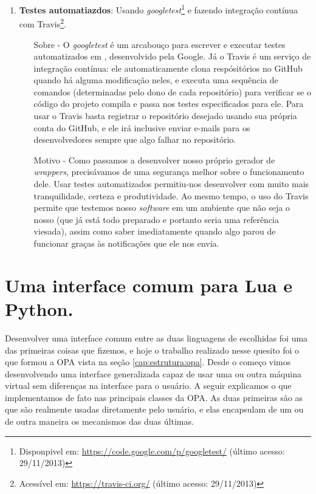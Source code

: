 \begin{enumerate}
    \item \textbf{Testes automatiazdos}: Usando \textit{googletest}\footnote{Disponpivel
      em: \url{https://code.google.com/p/googletest/} (último acesso: 29/11/2013)} e
      fazendo integração contínua com Travis\footnote{Acessível em:
      \url{https://travis-ci.org/} (último acesso: 29/11/2013)}.
      \begin{itemize}
        \item[Sobre -] O \textit{googletest} é um arcabouço para escrever e
          executar testes automatizados em \CXX{}, desenvolvido pela Google.
          Já o Travis é um serviço de integração contínua: ele
          automaticamente clona respósitórios no GitHub quando há alguma
          modificação neles, e executa uma sequência de comandos (determinadas
          pelo dono de cada repositório) para verificar se o código do projeto
          compila e passa nos testes especificados para ele. Para usar o
          Travis basta registrar o repositório desejado usando sua própria conta
          do GitHub, e ele irá inclusive enviar e-mails para os desenvolvedores
          sempre que algo falhar no repositório.
        \item[Motivo -] Como passamos a desenvolver nosso próprio gerador de
          \textit{wrappers}, precisávamos de uma segurança melhor sobre o
          funcionamento dele. Usar testes automatizados permitiu-nos desenvolver
          com muito mais tranquilidade, certeza e produtividade. Ao mesmo tempo,
          o uso do Travis permite que testemos nosso \textit{software} em
          um ambiente que não seja o nosso (que já está todo preparado e portanto
          seria uma referência viesada), assim como saber imediatamente quando
          algo parou de funcionar graças às notificações que ele nos envia.
      \end{itemize}
  \end{enumerate}
  
  \section{Uma interface comum para Lua e Python.}
  \label{sec:atividades:opa}
  Desenvolver uma interface comum entre as duas linguagens de \script{} escolhidas
  foi uma das primeiras coisas que fizemos, e hoje o trabalho realizado nesse
  quesito foi o que formou a OPA vista na seção \ref{cap:estrutura:opa}. Desde o
  começo vimos desenvolvendo uma interface generalizada capaz de usar uma ou outra
  máquina virtual sem diferenças na interface para o usuário. A seguir explicamos
  o que implementamos de fato nas principais classes da OPA. As duas primeiras são
  as que são realmente usadas diretamente pelo usuário, e elas encapsulam de um ou
  de outra maneira os mecanismos das duas últimas.
  
